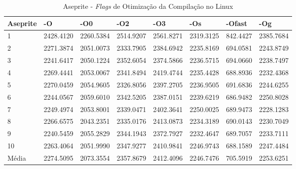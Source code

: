 \begin{apendicesenv}
\begin{table}[!ht]
\tiny
\centering
\caption{Aseprite - \textit{Flags} de Otimização da Compilação no Linux}
\label{tab:otimizacao_compilacao:linux:aseprite}
\begin{tabular}{llllllll}
\textbf{Aseprite} & \textbf{-O}  & \textbf{-O0}   & \textbf{-O2} & \textbf{-O3} & \textbf{-Os} & \textbf{-Ofast} & \textbf{-Og} \\ \toprule
1                 & 2428.4120    & 2260.5384      & 2514.9207    & 2561.8271    & 2319.3125    &    842.4427     & 2385.7684  \\ 
2                 & 2271.3874    & 2051.0073      & 2333.7905    & 2384.6942    & 2235.8169    &    694.0581     & 2243.8749  \\ 
3                 & 2241.6417    & 2050.1224      & 2352.6054    & 2374.5866    & 2236.5715    &    694.0660     & 2238.7497  \\ 
4                 & 2269.4441    & 2053.0067      & 2341.8494    & 2419.4744    & 2235.4428    &    688.8936     & 2232.4368  \\ 
5                 & 2270.0459    & 2054.9605      & 2326.8056    & 2397.2705    & 2236.9505    &    691.6836     & 2244.6255  \\ 
6                 & 2244.0567    & 2059.6010      & 2342.5205    & 2387.0151    & 2239.6219    &    686.9482     & 2250.8028  \\ 
7                 & 2249.4974    & 2053.8001      & 2339.0471    & 2402.3641    & 2250.0025    &    689.9473     & 2228.1283  \\ 
8                 & 2266.6575    & 2043.2351      & 2335.0176    & 2413.0873    & 2234.3189    &    690.0143     & 2230.7049  \\ 
9                 & 2240.5459    & 2055.2829      & 2344.1943    & 2372.7927    & 2232.4647    &    689.7057     & 2233.7111  \\ 
10                & 2263.4064    & 2051.9990      & 2347.9277    & 2410.9841    & 2246.9743    &    688.1589     & 2247.4484  \\ \bottomrule
Média             & 2274.5095    & 2073.3554      & 2357.8679    & 2412.4096    & 2246.7476    &    705.5919     & 2253.6251  \\ 
\end{tabular}
\end{table}


\end{apendicesenv}

